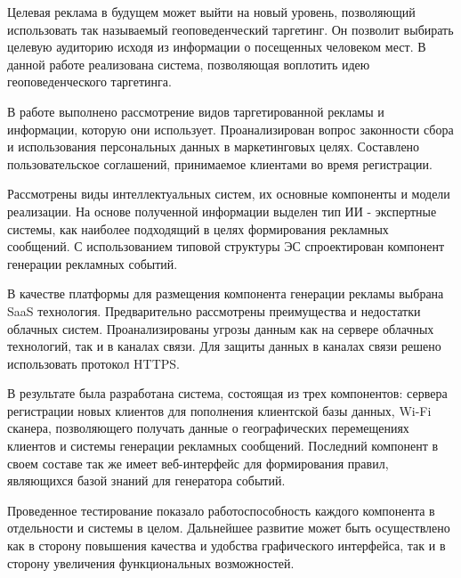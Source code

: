 \conclusion

Целевая реклама в будущем может выйти на новый уровень, позволяющий использовать так называемый геоповеденческий таргетинг. Он позволит выбирать целевую аудиторию исходя из информации о посещенных человеком мест. В данной работе реализована система, позволяющая воплотить идею геоповеденческого таргетинга.

В работе выполнено рассмотрение видов таргетированной рекламы и информации, которую они использует. Проанализирован вопрос законности сбора и использования персональных данных в маркетинговых целях. Составлено пользовательское соглашений, принимаемое клиентами во время регистрации.

Рассмотрены виды интеллектуальных систем, их основные компоненты и модели реализации. На основе полученной информации выделен тип ИИ - экспертные системы, как наиболее подходящий в целях формирования рекламных сообщений. С использованием типовой структуры ЭС спроектирован компонент генерации рекламных событий.

В качестве платформы для размещения компонента генерации рекламы выбрана SaaS технология. Предварительно рассмотрены преимущества и недостатки облачных систем. Проанализированы угрозы данным как на сервере облачных технологий, так и в каналах связи. Для защиты данных в каналах связи решено использовать протокол HTTPS.

В результате была разработана система, состоящая из трех компонентов: сервера регистрации новых клиентов для пополнения клиентской базы данных, Wi-Fi сканера, позволяющего получать данные о географических перемещениях клиентов и системы генерации рекламных сообщений. Последний компонент в своем составе так же имеет веб-интерфейс для формирования правил, являющихся базой знаний для генератора событий.

Проведенное тестирование показало работоспособность каждого компонента в отдельности и системы в целом. Дальнейшее развитие может быть осуществлено как в сторону повышения качества и удобства графического интерфейса, так и в сторону увеличения функциональных возможностей. 

\blindtext
